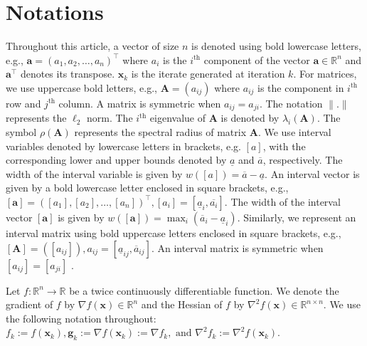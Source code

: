 \documentclass{elsarticle}
\newtheorem{definition}{Definition}
\numberwithin{equation}{section}
\begin{document}
\section{Notations}
Throughout this article, a vector of size $n$ is denoted using bold lowercase letters, e.g., $\mathbf{a} = (a_1, a_2, \dots, a_n)^\top$ where $a_i$ is the $i^{\text{th}}$ component of the vector $\mathbf{a} \in \mathbb{R}^n$ and $\mathbf{a}^\top$ denotes its transpose. $\mathbf{x}_k$ is the iterate generated at iteration $k$. For matrices, we use uppercase bold letters, e.g., $\mathbf{A} = (a_{ij})$ where $a_{ij}$ is the component in $i^{\text{th}}$ row and $j^{\text{th}}$ column. A matrix is symmetric when $a_{ij} = a_{ji}$. The notation $\|.\|$ represents the $\ell_2$ norm. The $i^{\text{th}}$ eigenvalue of \(\mathbf{A}\) is denoted by \(\lambda_i(\mathbf{A})\). The symbol $\rho(\mathbf{A})$ represents the spectral radius of matrix $\mathbf{A}$. We use interval variables denoted by lowercase letters in brackets, e.g. $[a]$, with the corresponding lower and upper bounds denoted by $\underline{a}$ and $\overline{a}$, respectively. The width of the interval variable is given by $w([a]) = \overline{a} - \underline{a}$. An interval vector is given by a bold lowercase letter enclosed in square brackets, e.g., $[\mathbf{a}] = \left([a_1], [a_2], \dots, [a_n]\right)^\top, [a_i] = [\underline{a}_i, \overline{a_i}]$. The width of the interval vector $[\mathbf{a}]$ is given by $w([\mathbf{a}]) = \max_{i} (\overline{a}_i - \underline{a}_i).$ Similarly, we represent an interval matrix using bold uppercase letters enclosed in square brackets, e.g., $[\mathbf{A}] = ([{a}_{ij}]), {a}_{ij} = [\underline{a}_{ij}, \overline{a}_{ij}]$. An interval matrix is symmetric when $[{a}_{ij}] = [{a}_{ji}]$ \cite{moore2009introduction}.

Let $f: \mathbb{R}^n \to \mathbb{R}$ be a twice continuously differentiable function. We denote the gradient of $f$ by $\nabla f(\mathbf{x}) \in \mathbb{R}^n$ and the Hessian of $f$ by $\nabla^2 f(\mathbf{x}) \in \mathbb{R}^{n \times n}$. We use the following notation throughout: $f_k:= f(\mathbf{x}_k), \mathbf{g}_k:= \nabla f(\mathbf{x}_k):= \nabla f_k, \text{ and } \nabla^{2} f_{k} := \nabla^2 f(\mathbf{x}_k)$. 

\end{document}
